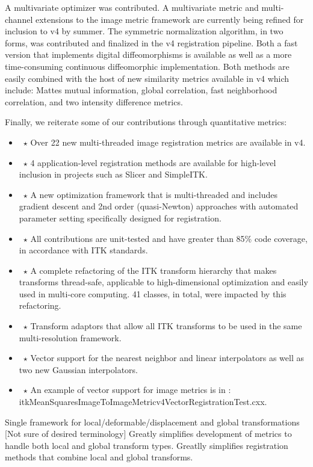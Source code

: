 \documentclass{frontiersSCNS}
\begin{document}
A multivariate optimizer was contributed. A multivariate metric and multi-channel extensions to the image metric framework are currently being refined for inclusion to v4 by summer. The symmetric normalization algorithm, in two forms, was contributed and finalized in the v4 registration pipeline. Both a fast version that implements digital diffeomorphisms is available as well as a more time-consuming continuous diffeomorphic implementation. Both methods are easily combined with the host of new similarity metrics available in v4 which include: Mattes mutual information, global correlation, fast neighborhood correlation, and two intensity difference metrics. 

Finally, we reiterate some of our contributions through quantitative metrics:
\begin{itemize}
\item~$\star$ Over 22 new multi-threaded image registration metrics are available in v4.
\item~$\star$ 4 application-level registration methods are available
  for high-level inclusion in projects such as Slicer and SimpleITK.
\item~$\star$ A new optimization framework that is multi-threaded and includes gradient descent and 2nd order (quasi-Newton) approaches with automated parameter setting specifically designed for registration.
\item~$\star$ All contributions are unit-tested and have greater than 85\% code coverage, in accordance with ITK standards.
\item~$\star$ A complete refactoring of the ITK transform hierarchy that makes transforms thread-safe, applicable to high-dimensional optimization and easily used in multi-core computing. 41 classes, in total, were impacted by this refactoring.

\item~$\star$ Transform adaptors that allow all ITK transforms to be used in the same multi-resolution framework. 

\item~$\star$ Vector support for the nearest neighbor and linear interpolators as well as two new Gaussian interpolators.
\item~$\star$ An example of vector support for image metrics is in : itkMeanSquaresImageToImageMetricv4VectorRegistrationTest.cxx.
\end{itemize}


Single framework for local/deformable/displacement and global transformations [Not sure of desired terminology]
Greatly simplifies development of metrics to handle both local and global transform types.
Greatlly simplifies registration methods that combine local and global transforms.
\end{document}
